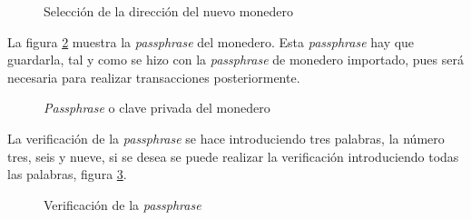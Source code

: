 \begin{figure}[H]
	\centering
	\caption{Selección de la dirección del nuevo monedero}
	\label{fig:wallet-13}
\end{figure}

La figura \ref{fig:wallet-14} muestra la \textit{passphrase} del monedero. Esta \textit{passphrase} hay que guardarla, tal y como se hizo con la \textit{passphrase} de monedero importado, pues será necesaria para realizar transacciones posteriormente.\\

\begin{figure}[H]
	\centering
	\caption{\textit{Passphrase} o clave privada del monedero}
	\label{fig:wallet-14}
\end{figure}

\newpage
La verificación de la \textit{passphrase} se hace introduciendo tres palabras, la número tres, seis y nueve, si se desea se puede realizar la verificación introduciendo todas las palabras, figura \ref{fig:wallet-15}.\\

\begin{figure}[H]
	\centering
	\caption{Verificación de la \textit{passphrase}}
	\label{fig:wallet-15}
\end{figure}

